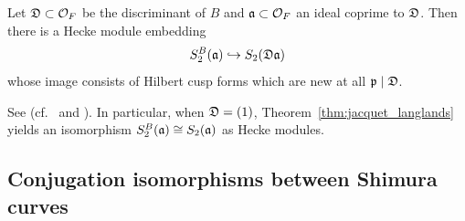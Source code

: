 \documentclass[main.tex]{subfiles}
\begin{document}

\begin{theorem} \label{thm:jacquet_langlands}
Let $\frD \subset \cO_F$ be the discriminant of $B$ and $\aa \subset \cO_F$ an ideal coprime to $\frD$. Then there is a Hecke module embedding
\[ S_2^B(\aa) \embed S_2(\frD \aa) \]
whose image consists of Hilbert cusp forms which are new at all $\p \mid \frD$.
\end{theorem}

See \cite[Proposition~2.12]{hida:abelian_varieties} (cf.\ \cite[Theorem~2.9]{Voight:computing_hecke} and \cite[Theorem~3.9]{Voight:explicit_methods}). In particular, when $\frD = (1)$, Theorem~\ref{thm:jacquet_langlands} yields an isomorphism $S_2^B(\aa) \cong S_2(\aa)$ as Hecke modules.

\subsection{Conjugation isomorphisms between Shimura curves}
\end{document}
